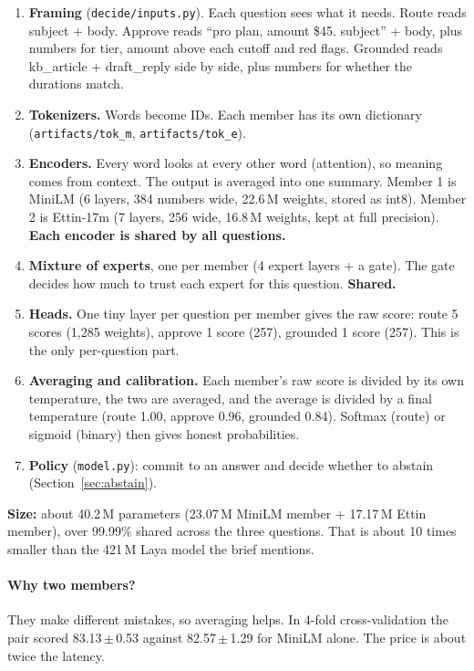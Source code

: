 \documentclass[11pt,a4paper]{article}
\begin{document}
\begin{enumerate}
  \item \textbf{Framing} (\texttt{decide/inputs.py}). Each question sees what it needs.
        Route reads subject + body. Approve reads ``pro plan, amount \$45. subject'' + body,
        plus numbers for tier, amount above each cutoff and red flags. Grounded reads
        kb\_article + draft\_reply side by side, plus numbers for whether the durations match.
  \item \textbf{Tokenizers.} Words become IDs. Each member has its own dictionary
        (\texttt{artifacts/tok\_m}, \texttt{artifacts/tok\_e}).
  \item \textbf{Encoders.} Every word looks at every other word (attention), so meaning
        comes from context. The output is averaged into one summary. Member 1 is MiniLM
        (6 layers, 384 numbers wide, 22.6\,M weights, stored as int8). Member 2 is
        Ettin-17m (7 layers, 256 wide, 16.8\,M weights, kept at full precision).
        \textbf{Each encoder is shared by all questions.}
  \item \textbf{Mixture of experts}, one per member (4 expert layers + a gate). The gate
        decides how much to trust each expert for this question. \textbf{Shared.}
  \item \textbf{Heads.} One tiny layer per question per member gives the raw score: route
        5 scores (1{,}285 weights), approve 1 score (257), grounded 1 score (257). This is
        the only per-question part.
  \item \textbf{Averaging and calibration.} Each member's raw score is divided by its own
        temperature, the two are averaged, and the average is divided by a final
        temperature (route 1.00, approve 0.96, grounded 0.84). Softmax (route) or sigmoid
        (binary) then gives honest probabilities.
  \item \textbf{Policy} (\texttt{model.py}): commit to an answer and decide whether to
        abstain (Section~\ref{sec:abstain}).
\end{enumerate}
\noindent\textbf{Size:} about 40.2\,M parameters (23.07\,M MiniLM member + 17.17\,M Ettin
member), over 99.99\% shared across the three questions. That is about 10 times smaller
than the 421\,M Laya model the brief mentions.

\paragraph{Why two members?} They make different mistakes, so averaging helps. In 4-fold
cross-validation the pair scored 83.13\,$\pm$\,0.53 against 82.57\,$\pm$\,1.29 for MiniLM
alone. The price is about twice the latency.
\end{document}
